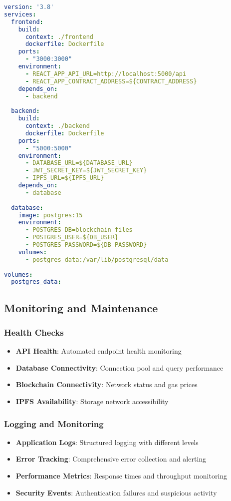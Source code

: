 \documentclass[11pt,a4paper]{article}
\begin{document}
\begin{lstlisting}[language=yaml, caption=Docker Compose Configuration]
version: '3.8'
services:
  frontend:
    build: 
      context: ./frontend
      dockerfile: Dockerfile
    ports:
      - "3000:3000"
    environment:
      - REACT_APP_API_URL=http://localhost:5000/api
      - REACT_APP_CONTRACT_ADDRESS=${CONTRACT_ADDRESS}
    depends_on:
      - backend
      
  backend:
    build:
      context: ./backend
      dockerfile: Dockerfile
    ports:
      - "5000:5000"
    environment:
      - DATABASE_URL=${DATABASE_URL}
      - JWT_SECRET_KEY=${JWT_SECRET_KEY}
      - IPFS_URL=${IPFS_URL}
    depends_on:
      - database
      
  database:
    image: postgres:15
    environment:
      - POSTGRES_DB=blockchain_files
      - POSTGRES_USER=${DB_USER}
      - POSTGRES_PASSWORD=${DB_PASSWORD}
    volumes:
      - postgres_data:/var/lib/postgresql/data
      
volumes:
  postgres_data:
\end{lstlisting}

\subsection{Monitoring and Maintenance}

\subsubsection{Health Checks}
\begin{itemize}
    \item \textbf{API Health}: Automated endpoint health monitoring
    \item \textbf{Database Connectivity}: Connection pool and query performance
    \item \textbf{Blockchain Connectivity}: Network status and gas prices
    \item \textbf{IPFS Availability}: Storage network accessibility
\end{itemize}

\subsubsection{Logging and Monitoring}
\begin{itemize}
    \item \textbf{Application Logs}: Structured logging with different levels
    \item \textbf{Error Tracking}: Comprehensive error collection and alerting
    \item \textbf{Performance Metrics}: Response times and throughput monitoring
    \item \textbf{Security Events}: Authentication failures and suspicious activity
\end{itemize}
\end{document}
